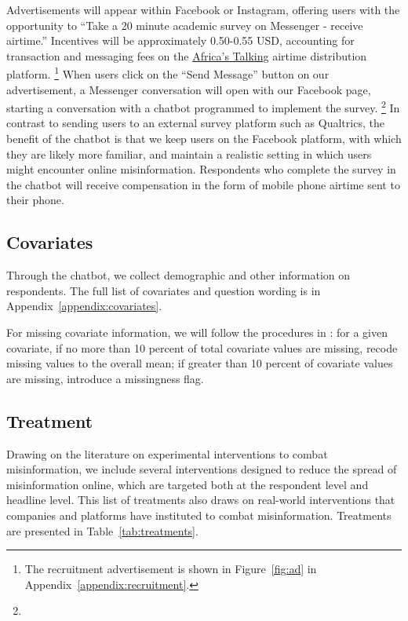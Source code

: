 \documentclass[letterpaper, 12pt, parskip=full,]{scrartcl}
\begin{document}
Advertisements will appear within Facebook or Instagram, offering users with the opportunity to ``Take a 20 minute academic survey on Messenger - receive airtime.'' Incentives will be approximately 0.50-0.55 USD, accounting for transaction and messaging fees on the \href{https://africastalking.com/}{Africa's Talking} airtime distribution platform.%
\footnote{The recruitment advertisement is shown in Figure~\ref{fig:ad} in Appendix~\ref{appendix:recruitment}.} %
 When users click on the ``Send Message'' button on our advertisement, a Messenger conversation will open with our Facebook page, starting a conversation with a chatbot programmed to implement the survey.%
 \footnote{\color{red}{[[TK: images of chatbot once linked to page]]}} %
 In contrast to sending users to an external survey platform such as Qualtrics, the benefit of the chatbot is that we keep users on the Facebook platform, with which they are likely more familiar, and maintain a realistic setting in which users might encounter online misinformation.  Respondents who complete the survey in the chatbot will receive compensation in the form of mobile phone airtime sent to their phone. %


\subsection{Covariates}
Through the chatbot, we collect demographic and other information on respondents. %
The full list of covariates and question wording is in Appendix~\ref{appendix:covariates}.
%

For missing covariate information, we will follow the procedures in \cite{greensop1.05}: for a given covariate, if no more than 10 percent of total covariate values are missing, recode missing values to the overall mean; if greater than 10 percent of covariate values are missing, introduce a missingness flag. 

\subsection{Treatment}
Drawing on the literature on experimental interventions to combat misinformation, we include several interventions designed to reduce the spread of misinformation online, which are targeted both at the respondent level and headline level. This list of treatments also draws on real-world interventions that companies and platforms have instituted to combat misinformation. Treatments are presented in Table~\ref{tab:treatments}. 
\end{document}
